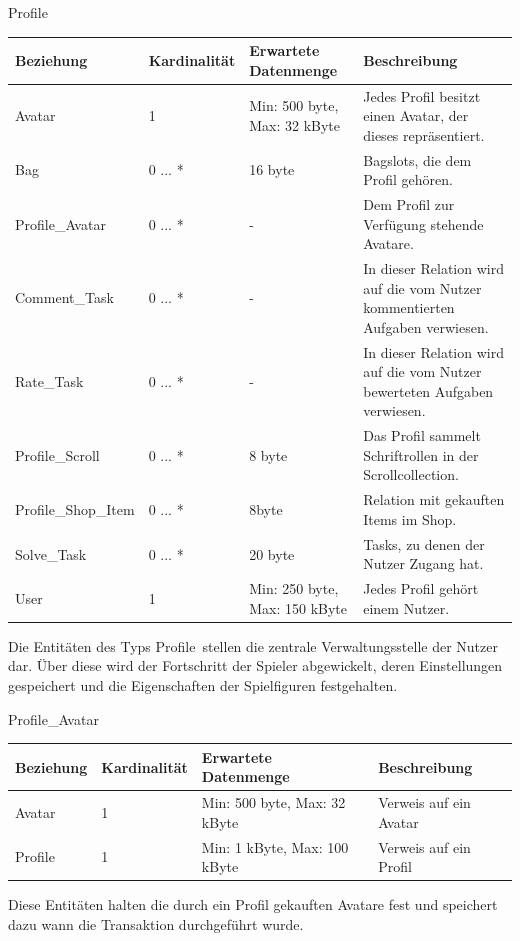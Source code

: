 \begin{entity}{70}{Profile}
\begin{center}
	\begin{longtable}{|m{4cm}|m{}|m{}|m{}|}
 	 \hline
 	 \textbf{Beziehung} & \textbf{Kardinalität} &  \textbf{Erwartete Datenmenge} & \textbf{Beschreibung} \\
  	\hline
  			Avatar & 1 & Min: 500 byte, Max: 32 kByte & Jedes Profil besitzt einen Avatar, der dieses repräsentiert.\\
	  \hline
	    	Bag & 0 ... * & 16 byte & Bagslots, die dem Profil gehören.\\
	  \hline
  			Profile\_Avatar & 0 ... *  & - & Dem Profil zur Verfügung stehende Avatare.\\
	  \hline
	    	Comment\_Task & 0 ... * & - & In dieser Relation wird auf die vom Nutzer kommentierten Aufgaben verwiesen. \\
	  \hline
	    	Rate\_Task & 0 ... * & - & In dieser Relation wird auf die vom Nutzer bewerteten Aufgaben verwiesen.\\
	  \hline
	    	Profile\_Scroll & 0 ... * & 8 byte & Das Profil sammelt Schriftrollen in der Scrollcollection.\\
	  \hline
	    	Profile\_Shop\_Item & 0 ... * & 8byte & Relation mit gekauften Items im Shop.\\
	  \hline 
	    	Solve\_Task & 0 ... * & 20 byte & Tasks, zu denen der Nutzer Zugang hat.\\
	  \hline
  	  		User & 1  & Min: 250 byte, Max: 150 kByte &  Jedes Profil gehört einem Nutzer.\\
	  \hline
	\end{longtable}
\end{center}
Die Entitäten des Typs \glqq Profile\grqq~stellen die zentrale Verwaltungsstelle der Nutzer dar. Über diese wird der Fortschritt der Spieler abgewickelt, deren Einstellungen gespeichert und die Eigenschaften der Spielfiguren festgehalten. 
\end{entity}

\newpage
\begin{entity}{80}{Profile\_Avatar}
\begin{center}
	\begin{longtable}{|m{4cm}|m{}|m{}|m{}|}
 	 \hline
 	 \textbf{Beziehung} & \textbf{Kardinalität} &  \textbf{Erwartete Datenmenge} & \textbf{Beschreibung} \\
  	\hline
	Avatar & 1  & Min: 500 byte, Max: 32 kByte & Verweis auf ein Avatar\\
	  \hline
  	Profile & 1  & Min: 1 kByte, Max: 100 kByte & Verweis auf ein Profil\\
	  \hline
	\end{longtable}
\end{center}
Diese Entitäten halten die durch ein Profil gekauften Avatare fest und speichert dazu wann die Transaktion durchgeführt wurde.\\\\\\\
\end{entity}

